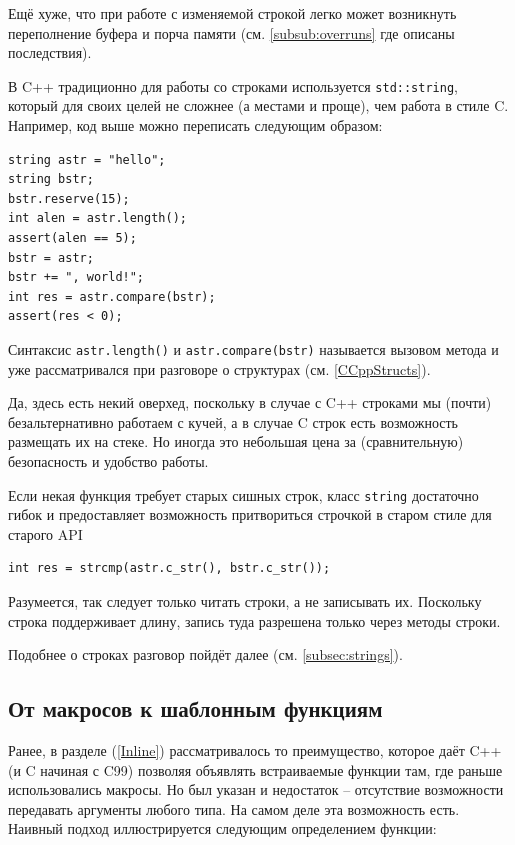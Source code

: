 \documentclass[a4paper,12pt,oneside]{book}
\begin{document}
Ещё хуже, что при работе с изменяемой строкой легко может возникнуть переполнение буфера и порча памяти (см. \ref{subsub:overruns} где описаны последствия).

В C++ традиционно для работы со строками используется \lstinline!std::string!, который для своих целей не сложнее (а местами и проще), чем работа в стиле C. Например, код выше можно переписать следующим образом:

\begin{lstlisting}
string astr = "hello";
string bstr; 
bstr.reserve(15);
int alen = astr.length();
assert(alen == 5);
bstr = astr;
bstr += ", world!";
int res = astr.compare(bstr);
assert(res < 0);
\end{lstlisting}

Синтаксис \lstinline!astr.length()! и \lstinline!astr.compare(bstr)! называется вызовом метода и уже рассматривался при разговоре о структурах (см. \ref{CCppStructs}).

Да, здесь есть некий оверхед, поскольку в случае с C++ строками мы (почти) безальтернативно работаем с кучей, а в случае C строк есть возможность размещать их на стеке. Но иногда это небольшая цена за (сравнительную) безопасность и удобство работы.

Если некая функция требует старых сишных строк, класс \lstinline!string! достаточно гибок и предоставляет возможность притвориться строчкой в старом стиле для старого API

\begin{lstlisting}
int res = strcmp(astr.c_str(), bstr.c_str());
\end{lstlisting}

Разумеется, так следует только читать строки, а не записывать их. Поскольку строка поддерживает длину, запись туда разрешена только через методы строки.

Подобнее о строках разговор пойдёт далее (см. \ref{subsec:strings}).

\subsection{От макросов к шаблонным функциям}\label{FunctionTemplate}

Ранее, в разделе (\ref{Inline}) рассматривалось то преимущество, которое даёт C++ (и C начиная с C99) позволяя объявлять встраиваемые функции там, где раньше использовались макросы. Но был указан и недостаток -- отсутствие возможности передавать аргументы любого типа. На самом деле эта возможность есть. Наивный подход иллюстрируется следующим определением функции:
\end{document}
